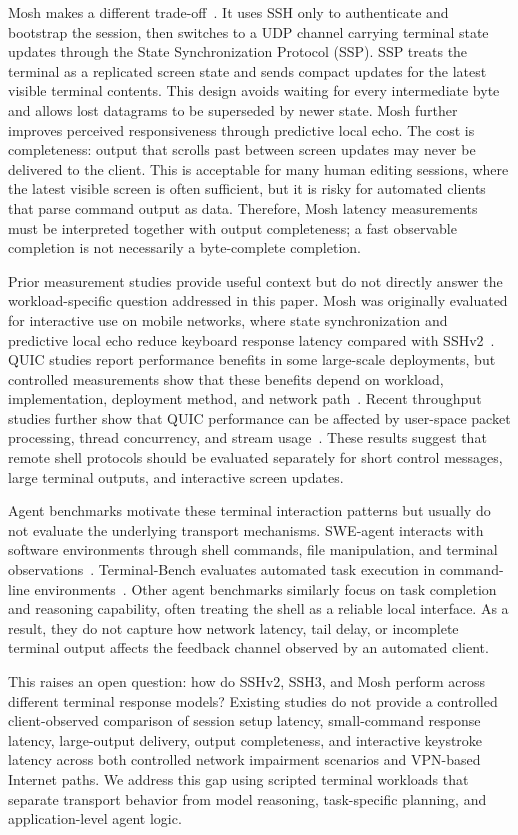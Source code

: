 Mosh makes a different trade-off~\cite{Winstein2012}. It uses SSH only to
authenticate and bootstrap the session, then switches to a UDP channel
carrying terminal state updates through the State Synchronization Protocol
(SSP). SSP treats the terminal as a replicated screen state and sends compact updates for the latest visible terminal contents. This design avoids waiting for every intermediate byte and allows lost datagrams to be superseded by newer state. Mosh further improves perceived responsiveness through predictive local echo. The cost is completeness: output that scrolls past between screen updates may never be delivered to the client. This is acceptable for many human editing sessions, where the latest visible screen is often sufficient, but it is risky for automated clients that parse command output as data. Therefore, Mosh latency measurements must be interpreted together with output completeness; a fast observable completion is not necessarily a byte-complete completion.

Prior measurement studies provide useful context but do not directly answer the workload-specific question addressed in this paper. Mosh was originally evaluated for interactive use on mobile networks, where state synchronization and predictive local echo reduce keyboard response latency compared with SSHv2~\cite{Winstein2012}. QUIC studies report performance benefits in some large-scale deployments, but controlled measurements show that these benefits depend on workload, implementation, deployment method, and network path~\cite{Langley2017,Kakhki2017}. Recent throughput studies further show that QUIC performance can be affected by user-space packet processing, thread concurrency, and stream usage~\cite{Konig2025}. These results suggest that remote shell protocols should be evaluated separately for short control messages, large terminal outputs, and interactive screen updates.

Agent benchmarks motivate these terminal interaction patterns but usually do not evaluate the underlying transport mechanisms. SWE-agent interacts with software environments through shell commands, file manipulation, and terminal observations~\cite{Yang2024}. Terminal-Bench evaluates automated task execution in command-line environments~\cite{Merrill2026}. Other agent benchmarks similarly focus on task completion and reasoning capability, often treating the shell as a reliable local interface. As a result, they do not capture how network latency, tail delay, or incomplete terminal output affects the feedback channel observed by an automated client.

This raises an open question: how do SSHv2, SSH3, and Mosh perform across
different terminal response models? Existing studies do not provide a
controlled client-observed comparison of session setup latency, small-command response latency, large-output delivery, output completeness, and interactive keystroke latency across both controlled network impairment scenarios and VPN-based Internet paths. We address this gap using scripted terminal workloads that separate transport behavior from model reasoning, task-specific planning, and application-level agent logic.
